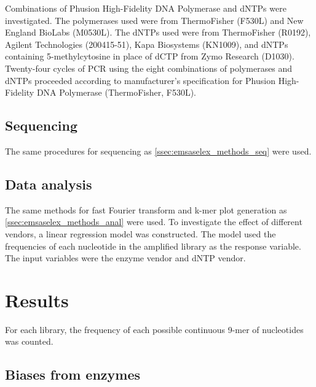 \documentclass[parskip=full, numbers=noenddot]{scrreprt}
\begin{document}
Combinations of Phusion High-Fidelity DNA Polymerase and dNTPs were investigated.  The polymerases used were from ThermoFisher (F530L) and New England BioLabs (M0530L).  The dNTPs used were from ThermoFisher (R0192), Agilent Technologies (200415-51), Kapa Biosystems (KN1009), and dNTPs containing 5-methylcytosine in place of dCTP from Zymo Research (D1030).  Twenty-four cycles of PCR using the eight combinations of polymerases and dNTPs proceeded according to manufacturer's specification for Phusion High-Fidelity DNA Polymerase (ThermoFisher, F530L).

\subsection{Sequencing}
\label{ssec:pcrbias_methods_seq}

The same procedures for sequencing as \ref{ssec:emsaselex_methods_seq} were used.

\subsection{Data analysis}
\label{ssec:pcrbias_methods_anal}

The same methods for fast Fourier transform and k-mer plot generation as \ref{ssec:emsaselex_methods_anal} were used.
To investigate the effect of different vendors, a linear regression model was constructed.  The model used the frequencies of each nucleotide in the amplified library as the response variable.  The input variables were the enzyme vendor and dNTP vendor.

\section{Results}
\label{sec:pcrbias_results}

For each library, the frequency of each possible continuous 9-mer of nucleotides was counted.


\subsection{Biases from enzymes}
\label{ssec:pcrbias_result_enz}
\end{document}
